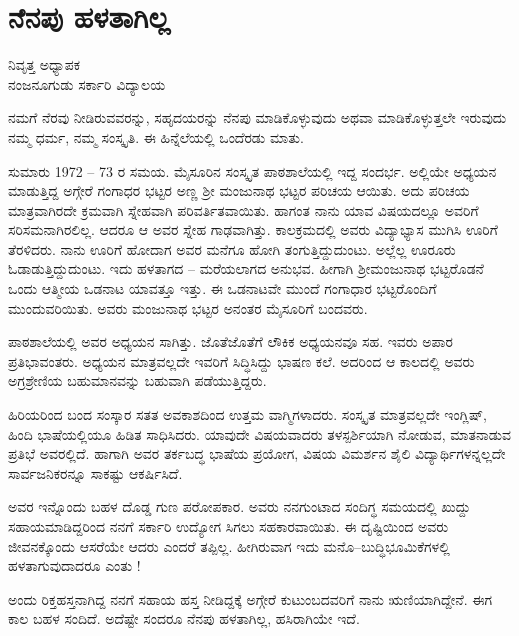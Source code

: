 {\fontsize{14}{16}\selectfont
\chapter{ನೆನಪು ಹಳತಾಗಿಲ್ಲ}

\begin{center}
\smallskip

ನಿವೃತ್ತ ಅಧ್ಯಾಪಕ\\
ನಂಜನೂಗುಡು ಸರ್ಕಾರಿ ವಿದ್ಯಾಲಯ
\addrule
\end{center}

ನಮಗೆ ನೆರವು ನೀಡಿರುವವರನ್ನು, ಸಹೃದಯರನ್ನು ನೆನಪು ಮಾಡಿಕೊಳ್ಳುವುದು ಅಥವಾ ಮಾಡಿಕೊಳ್ಳುತ್ತಲೇ ಇರುವುದು ನಮ್ಮ ಧರ್ಮ, ನಮ್ಮ ಸಂಸ್ಕೃತಿ. ಈ ಹಿನ್ನೆಲೆಯಲ್ಲಿ ಒಂದೆರಡು ಮಾತು.

ಸುಮಾರು 1972 – 73 ರ ಸಮಯ. ಮೈಸೂರಿನ ಸಂಸ್ಕೃತ ಪಾಠಶಾಲೆಯಲ್ಲಿ ಇದ್ದ ಸಂದರ್ಭ. ಅಲ್ಲಿಯೇ ಅಧ್ಯಯನ ಮಾಡುತ್ತಿದ್ದ ಅಗ್ಗೇರೆ ಗಂಗಾಧರ ಭಟ್ಟರ ಅಣ್ಣ ಶ್ರೀ ಮಂಜುನಾಥ ಭಟ್ಟರ ಪರಿಚಯ ಆಯಿತು. ಅದು ಪರಿಚಯ ಮಾತ್ರವಾಗಿರದೇ ಕ್ರಮವಾಗಿ ಸ್ನೇಹವಾಗಿ ಪರಿವರ್ತಿತವಾಯಿತು. ಹಾಗಂತ ನಾನು ಯಾವ ವಿಷಯದಲ್ಲೂ ಅವರಿಗೆ ಸರಿಸಮನಾಗಿರಲಿಲ್ಲ. ಆದರೂ ಆ ಅವರ ಸ್ನೇಹ ಗಾಢವಾಗಿತ್ತು. ಕಾಲಕ್ರಮದಲ್ಲಿ ಅವರು ವಿದ್ಯಾಭ್ಯಾಸ ಮುಗಿಸಿ ಊರಿಗೆ ತೆರಳಿದರು. ನಾನು ಊರಿಗೆ ಹೋದಾಗ ಅವರ ಮನೆಗೂ ಹೋಗಿ ತಂಗುತ್ತಿದ್ದುದುಂಟು. ಅಲ್ಲೆಲ್ಲ ಊರೂರು ಓಡಾಡುತ್ತಿದ್ದುದುಂಟು. ಇದು ಹಳತಾಗದ – ಮರೆಯಲಾಗದ ಅನುಭವ. ಹೀಗಾಗಿ ಶ್ರೀಮಂಜುನಾಥ ಭಟ್ಟರೊಡನೆ ಒಂದು ಆತ್ಮೀಯ ಒಡನಾಟ ಯಾವತ್ತೂ ಇತ್ತು. ಈ ಒಡನಾಟವೇ ಮುಂದೆ ಗಂಗಾಧಾರ ಭಟ್ಟರೊಂದಿಗೆ ಮುಂದುವರಿಯಿತು. ಅವರು ಮಂಜುನಾಥ ಭಟ್ಟರ ಅನಂತರ ಮೈಸೂರಿಗೆ ಬಂದವರು.

ಪಾಠಶಾಲೆಯಲ್ಲಿ ಅವರ ಅಧ್ಯಯನ ಸಾಗಿತ್ತು. ಜೊತೆಜೊತೆಗೆ ಲೌಕಿಕ ಅಧ್ಯಯನವೂ ಸಹ. ಇವರು ಅಪಾರ ಪ್ರತಿಭಾವಂತರು. ಅಧ್ಯಯನ ಮಾತ್ರವಲ್ಲದೇ ಇವರಿಗೆ ಸಿದ್ಧಿಸಿದ್ದು ಭಾಷಣ ಕಲೆ. ಅದರಿಂದ ಆ ಕಾಲದಲ್ಲಿ ಅವರು ಅಗ್ರಶ್ರೇಣಿಯ ಬಹುಮಾನವನ್ನು ಬಹುವಾಗಿ ಪಡೆಯುತ್ತಿದ್ದರು. 

ಹಿರಿಯರಿಂದ ಬಂದ ಸಂಸ್ಕಾರ ಸತತ ಅವಕಾಶದಿಂದ ಉತ್ತಮ ವಾಗ್ಮಿಗಳಾದರು. ಸಂಸ್ಕೃತ ಮಾತ್ರವಲ್ಲದೇ ಇಂಗ್ಲಿಷ್, ಹಿಂದಿ ಭಾಷೆಯಲ್ಲಿಯೂ ಹಿಡಿತ ಸಾಧಿಸಿದರು. ಯಾವುದೇ ವಿಷಯವಾದರು ತಳಸ್ಪರ್ಶಿಯಾಗಿ ನೋಡುವ, ಮಾತನಾಡುವ ಪ್ರತಿಭೆ ಅವರಲ್ಲಿದೆ. ಹಾಗಾಗಿ ಅವರ ತರ್ಕಬದ್ಧ ಭಾಷೆಯ ಪ್ರಯೋಗ, ವಿಷಯ ವಿಮರ್ಶನ ಶೈಲಿ ವಿದ್ಯಾರ್ಥಿಗಳನ್ನಲ್ಲದೇ ಸಾರ್ವಜನಿಕರನ್ನೂ ಸಾಕಷ್ಟು ಆಕರ್ಷಿಸಿದೆ. 

ಅವರ ಇನ್ನೊಂದು ಬಹಳ ದೊಡ್ಡ ಗುಣ ಪರೋಪಕಾರ. ಅವರು ನನಗುಂಟಾದ ಸಂದಿಗ್ಧ ಸಮಯದಲ್ಲಿ  ಖುದ್ದು ಸಹಾಯಮಾಡಿದ್ದರಿಂದ ನನಗೆ ಸರ್ಕಾರಿ ಉದ್ಯೋಗ ಸಿಗಲು ಸಹಕಾರವಾಯಿತು. ಈ ದೃಷ್ಟಿಯಿಂದ ಅವರು ಜೀವನಕ್ಕೊಂದು ಆಸರೆಯೇ ಆದರು ಎಂದರೆ ತಪ್ಪಿಲ್ಲ. ಹೀಗಿರುವಾಗ ಇದು ಮನೊ–ಬುದ್ಧಿಭೂಮಿಕೆಗಳಲ್ಲಿ ಹಳತಾಗುವುದಾದರೂ ಎಂತು !

ಅಂದು ರಿಕ್ತಹಸ್ತನಾಗಿದ್ದ ನನಗೆ ಸಹಾಯ ಹಸ್ತ ನೀಡಿದ್ದಕ್ಕೆ ಅಗ್ಗೇರೆ ಕುಟುಂಬದವರಿಗೆ ನಾನು ಋಣಿಯಾಗಿದ್ದೇನೆ. ಈಗ ಕಾಲ ಬಹಳ ಸಂದಿದೆ.  ಅದೆಷ್ಟೇ ಸಂದರೂ ನೆನಪು ಹಳತಾಗಿಲ್ಲ, ಹಸಿರಾಗಿಯೇ ಇದೆ.

\articleend
}
